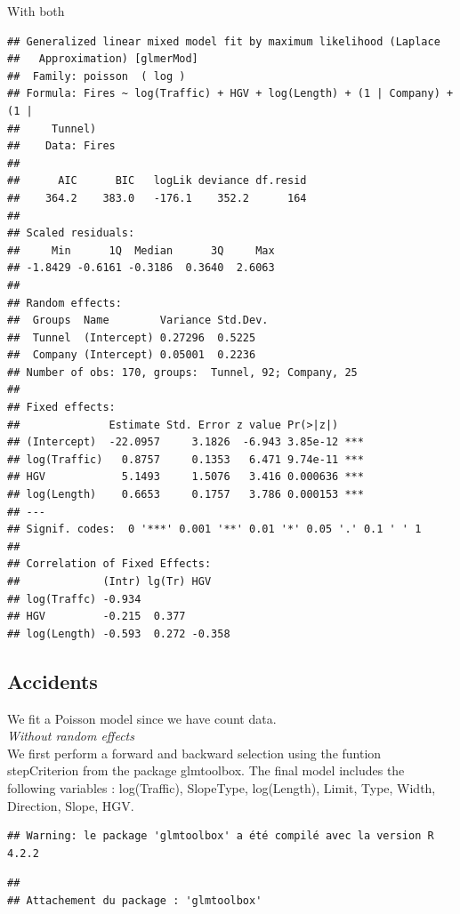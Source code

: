 \documentclass[
]{article}
\begin{document}
With both

\begin{verbatim}
## Generalized linear mixed model fit by maximum likelihood (Laplace
##   Approximation) [glmerMod]
##  Family: poisson  ( log )
## Formula: Fires ~ log(Traffic) + HGV + log(Length) + (1 | Company) + (1 |  
##     Tunnel)
##    Data: Fires
## 
##      AIC      BIC   logLik deviance df.resid 
##    364.2    383.0   -176.1    352.2      164 
## 
## Scaled residuals: 
##     Min      1Q  Median      3Q     Max 
## -1.8429 -0.6161 -0.3186  0.3640  2.6063 
## 
## Random effects:
##  Groups  Name        Variance Std.Dev.
##  Tunnel  (Intercept) 0.27296  0.5225  
##  Company (Intercept) 0.05001  0.2236  
## Number of obs: 170, groups:  Tunnel, 92; Company, 25
## 
## Fixed effects:
##              Estimate Std. Error z value Pr(>|z|)    
## (Intercept)  -22.0957     3.1826  -6.943 3.85e-12 ***
## log(Traffic)   0.8757     0.1353   6.471 9.74e-11 ***
## HGV            5.1493     1.5076   3.416 0.000636 ***
## log(Length)    0.6653     0.1757   3.786 0.000153 ***
## ---
## Signif. codes:  0 '***' 0.001 '**' 0.01 '*' 0.05 '.' 0.1 ' ' 1
## 
## Correlation of Fixed Effects:
##             (Intr) lg(Tr) HGV   
## log(Traffc) -0.934              
## HGV         -0.215  0.377       
## log(Length) -0.593  0.272 -0.358
\end{verbatim}

\hypertarget{accidents}{%
\subsection{Accidents}\label{accidents}}

We fit a Poisson model since we have count data.\\

\emph{Without random effects}\\

We first perform a forward and backward selection using the funtion
stepCriterion from the package glmtoolbox. The final model includes the
following variables : log(Traffic), SlopeType, log(Length), Limit, Type,
Width, Direction, Slope, HGV.

\begin{verbatim}
## Warning: le package 'glmtoolbox' a été compilé avec la version R 4.2.2
\end{verbatim}

\begin{verbatim}
## 
## Attachement du package : 'glmtoolbox'
\end{verbatim}
\end{document}
